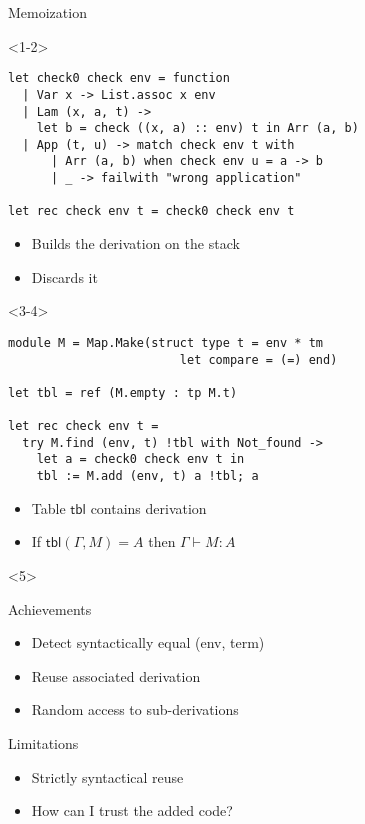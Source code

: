 \documentclass{beamer}
\begin{document}
\begin{frame}[fragile]{Memoization}
  \begin{overlayarea}{\textwidth}{14em}

    \begin{onlyenv}<1-2>
      \begin{lstlisting}
let check0 check env = function
  | Var x -> List.assoc x env
  | Lam (x, a, t) ->
    let b = check ((x, a) :: env) t in Arr (a, b)
  | App (t, u) -> match check env t with
      | Arr (a, b) when check env u = a -> b
      | _ -> failwith "wrong application"

let rec check env t = check0 check env t
      \end{lstlisting}
      \pause\vspace{1em}
      \begin{itemize}
      \item Builds the derivation on the stack
      \item Discards it
      \end{itemize}
    \end{onlyenv}

    \begin{onlyenv}<3-4>
      \begin{lstlisting}
module M = Map.Make(struct type t = env * tm
                        let compare = (=) end)

let tbl = ref (M.empty : tp M.t)

let rec check env t =
  try M.find (env, t) !tbl with Not_found ->
    let a = check0 check env t in
    tbl := M.add (env, t) a !tbl; a
      \end{lstlisting}
      \pause\pause\vspace{1em}
      \begin{itemize}
      \item Table $\mathsf{tbl}$ contains derivation
      \item If $\mathsf{tbl}(\Gamma, M) = A$ then $\Gamma\vdash M : A$
      \end{itemize}

    \end{onlyenv}

    \begin{onlyenv}<5>
      \begin{block}{Achievements}
        \begin{itemize}
        \item Detect syntactically equal (env, term)
        \item Reuse associated derivation
        \item Random access to sub-derivations
        \end{itemize}
      \end{block}
      \begin{block}{Limitations}
        \begin{itemize}
        \item Strictly syntactical reuse
        \item How can I trust the added code?
        \end{itemize}
      \end{block}
    \end{onlyenv}


\end{overlayarea}
\end{frame}
\end{document}
